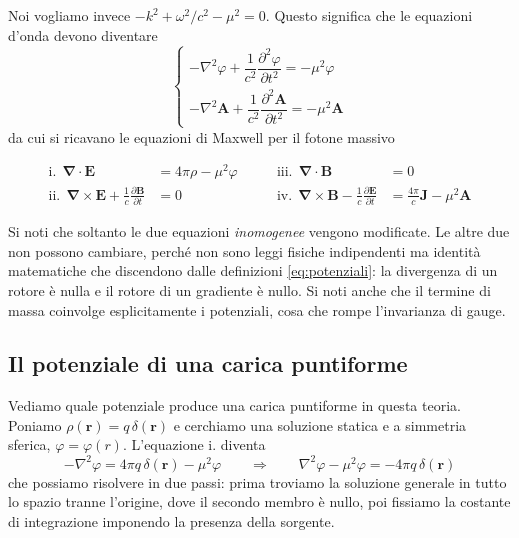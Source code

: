 Noi vogliamo invece $-k^2 + \omega^2/c^2 - \mu^2 = 0$. Questo significa che le equazioni d'onda devono diventare
%
\begin{equation}
\begin{cases}
    -\nabla^2 \varphi + \dfrac{1}{c^2}\dfrac{\partial^2 \varphi}{\partial t^2} = -\mu^2 \varphi \\[8pt]
    -\nabla^2 \mathbf{A} + \dfrac{1}{c^2}\dfrac{\partial^2 \mathbf{A}}{\partial t^2} = -\mu^2 \mathbf{A}
\end{cases}
\end{equation}
da cui si ricavano le equazioni di Maxwell per il fotone massivo

\begin{tcolorbox}[colback=black!5!white, colframe=black!45!white, boxrule=0.8pt]
\begin{equation}
\begin{aligned}
    \text{i.} \ \ \mathbf{\nabla}\cdot\mathbf{E} &= 4\pi\rho - \mu^2 \varphi  &\qquad \text{iii.} \ \ \mathbf{\nabla}\cdot\mathbf{B} &= 0 \\
    \text{ii.} \ \ \mathbf{\nabla}\times\mathbf{E} + \frac{1}{c}\frac{\partial \mathbf{B}}{\partial t} &= 0 &\qquad \text{iv.} \ \ \mathbf{\nabla}\times\mathbf{B} - \frac{1}{c}\frac{\partial \mathbf{E}}{\partial t} &= \frac{4\pi}{c}\mathbf{J} - \mu^2 \mathbf{A}
\end{aligned}
\end{equation}
\end{tcolorbox}
Si noti che soltanto le due equazioni \emph{inomogenee} vengono modificate. Le altre due non possono cambiare, perché non sono leggi fisiche indipendenti ma identità matematiche che discendono dalle definizioni \eqref{eq:potenziali}: la divergenza di un rotore è nulla e il rotore di un gradiente è nullo. Si noti anche che il termine di massa coinvolge esplicitamente i potenziali, cosa che rompe l'invarianza di gauge.

\newpage

\subsection{Il potenziale di una carica puntiforme}

Vediamo quale potenziale produce una carica puntiforme in questa teoria. Poniamo $\rho(\mathbf{r}) = q\,\delta(\mathbf{r})$ e cerchiamo una soluzione statica e a simmetria sferica, $\varphi = \varphi(r)$. L'equazione i. diventa
%
\begin{equation}
    -\nabla^2 \varphi = 4\pi q \, \delta(\mathbf{r}) - \mu^2\varphi \qquad \Longrightarrow \qquad \nabla^2 \varphi - \mu^2 \varphi = -4\pi q \, \delta(\mathbf{r})
    \label{eq:poisson_massivo}
\end{equation}
che possiamo risolvere in due passi: prima troviamo la soluzione generale in tutto lo spazio tranne l'origine, dove il secondo membro è nullo, poi fissiamo la costante di integrazione imponendo la presenza della sorgente.\\


